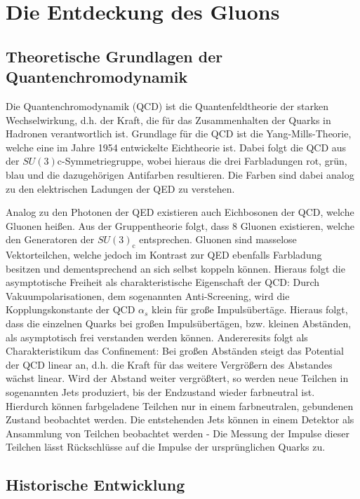 
\section{Die Entdeckung des Gluons}


\subsection{Theoretische Grundlagen der Quantenchromodynamik}
Die Quantenchromodynamik (QCD) ist die Quantenfeldtheorie der starken Wechselwirkung, d.h. der Kraft, die für das Zusammenhalten der Quarks in Hadronen verantwortlich ist.
Grundlage für die QCD ist die Yang-Mills-Theorie, welche eine im Jahre 1954 entwickelte Eichtheorie ist.
Dabei folgt die QCD aus der $SU(3)\text{c}$-Symmetriegruppe, wobei hieraus die drei Farbladungen rot, grün, blau und die dazugehörigen Antifarben resultieren.
Die Farben sind dabei analog zu den elektrischen Ladungen der QED zu verstehen.

Analog zu den Photonen der QED existieren auch Eichbosonen der QCD, welche Gluonen heißen.
Aus der Gruppentheorie folgt, dass 8 Gluonen existieren, welche den Generatoren der $SU(3)_\text{c}$ entsprechen.
Gluonen sind masselose Vektorteilchen, welche jedoch im Kontrast zur QED ebenfalls Farbladung besitzen und dementsprechend an sich selbst koppeln können.
Hieraus folgt die asymptotische Freiheit als charakteristische Eigenschaft der QCD:
Durch Vakuumpolarisationen, dem sogenannten Anti-Screening, wird die Kopplungskonstante der QCD $\alpha_{s}$ klein für große Impulsübertäge. 
Hieraus folgt, dass die einzelnen Quarks bei großen Impulsübertägen, bzw. kleinen Abständen, als asymptotisch frei verstanden werden können.
Andereresits folgt als Charakteristikum das Confinement: Bei großen Abständen steigt das Potential der QCD linear an, d.h. die Kraft für das weitere Vergrößern des Abstandes wächst linear.
Wird der Abstand weiter vergrößtert, so werden neue Teilchen in sogenannten Jets produziert, bis der Endzustand wieder farbneutral ist.
Hierdurch können farbgeladene Teilchen nur in einem farbneutralen, gebundenen Zustand beobachtet werden.
Die entstehenden Jets können in einem Detektor als Ansammlung von Teilchen beobachtet werden - Die Messung der Impulse dieser Teilchen lässt Rückschlüsse auf die Impulse der ursprünglichen Quarks zu.

\subsection{Historische Entwicklung}

